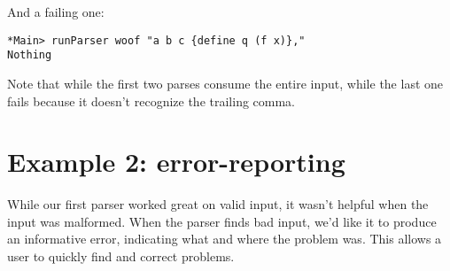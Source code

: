 \documentclass{tmr}
\begin{document}
And a failing one:
\begin{verbatim}
*Main> runParser woof "a b c {define q (f x)},"
Nothing
\end{verbatim}

Note that while the first two parses consume the entire input, while the last 
one fails because it doesn't recognize the trailing comma.




\section{Example 2: error-reporting}
While our first parser worked great on valid input, it wasn't helpful
when the input was malformed.  When the parser finds bad input, we'd like it to 
produce an informative error, indicating what and where the problem was.  
This allows a user to quickly find and correct problems.
\end{document}
